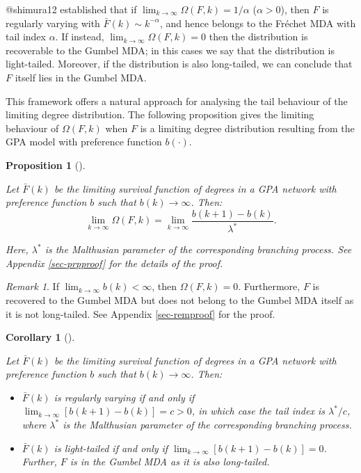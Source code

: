 \documentclass[
  sn-basic,
  10pt,
]{sn-jnl}
\theoremstyle{plain}
\newtheorem{corollary}{Corollary}[section]
\theoremstyle{plain}
\newtheorem{proposition}{Proposition}[section]
\theoremstyle{remark}
\newtheorem{refremark}{Remark}[section]
\begin{document}
@shimura12 established that if $\lim_{k\rightarrow\infty} \Omega(F,k) = 1/\alpha$ ($\alpha>0$), then $F$ is regularly varying with $\bar F(k) \sim k^{-\alpha}$, and hence belongs to the Fr\'echet MDA with tail index $\alpha$. If instead, $\lim_{k\rightarrow\infty} \Omega(F,k) = 0$ then the distribution is recoverable to the Gumbel MDA; in this cases we say that the distribution is light-tailed. Moreover, if the distribution is also long-tailed, we can conclude that $F$ itself lies in the Gumbel MDA.

This framework offers a natural approach for analysing the tail
behaviour of the limiting degree distribution. The following proposition
gives the limiting behaviour of \(\Omega(F,k)\) when \(F\) is a limiting
degree distribution resulting from the GPA model with preference
function \(b(\cdot)\).

\begin{proposition}[]\protect\hypertarget{prp-omega}{}\label{prp-omega}

Let \(\bar F (k)\) be the limiting survival function of degrees in a GPA
network with preference function \(b\) such that
\(b(k)\rightarrow\infty\). Then: \[
\lim_{k\rightarrow\infty}\Omega(F,k) = \lim_{k\rightarrow\infty}\frac{b(k+1)-b(k)}{\lambda^*}.
\]

Here, \(\lambda^*\) is the Malthusian parameter of the corresponding
branching process. See Appendix \ref{sec-prpproof} for the details of
the proof.

\end{proposition}

\begin{refremark}
If \(\lim_{k\rightarrow\infty}b(k)<\infty\), then \(\Omega(F, k) = 0\).
Furthermore, \(F\) is recovered to the Gumbel MDA but does not belong to
the Gumbel MDA itself as it is not long-tailed. See Appendix
\ref{sec-remproof} for the proof.

\label{rem-omega}

\end{refremark}

\begin{corollary}[]\protect\hypertarget{cor-omega2}{}\label{cor-omega2}

Let \(\bar F (k)\) be the limiting survival function of degrees in a GPA
network with preference function \(b\) such that
\(b(k)\rightarrow\infty\). Then:

\begin{itemize}
\item
  \(\bar F(k)\) is regularly varying if and only if
  \(\lim_{k\rightarrow\infty}[b(k+1)-b(k)]=c>0\), in which case the tail
  index is \(\lambda^*/c\), where \(\lambda^*\) is the Malthusian
  parameter of the corresponding branching process.
\item
  \(\bar F(k)\) is light-tailed if and only if
  \(\lim_{k\rightarrow\infty}[b(k+1)-b(k)]=0\). Further, \(F\) is in the
  Gumbel MDA as it is also long-tailed.
\end{itemize}

\end{corollary}
\end{document}

